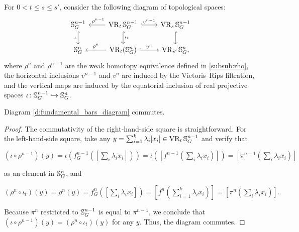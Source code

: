 \subsubsection{}

For $0<t\leq s \leq s'$, consider the following diagram of topological spaces:
\begin{equation}\label{d:fundamental_bars_diagram}
	\begin{tikzcd}
		\bS^{n-1}_G
		\ar[d, hook,"{\iota}" left]
		&
		\VR_t\bS^{n-1}_G
		\ar[d, hook,"\iota_t"]
		\ar[l, "\ \rho^{n-1}" above]
		\ar[r, hook, "v^{n-1}"]
		&
		\VR_{s}\bS^{n-1}_G
		\ar[d, hook]
		\\
		\bS^{n}_G
		&
		\VR_t(\bS^{n}_G)
		\ar[l, "\rho^n" above]
		\ar[r, hook, "v^{n}"]
		&
		\VR_{s'}\bS^{n}_G,
	\end{tikzcd}
\end{equation}
where $\rho^n$ and $\rho^{n-1}$ are the weak homotopy equivalence defined in \cref{subsub:rho}, the horizontal inclusions $v^{n-1}$ and $v^n$ are induced by the Vietoris--Rips filtration, and the vertical maps are induced by the equatorial inclusion of real projective spaces $\iota \colon \mathbb{S}^{n-1}_G \hookrightarrow \mathbb{S}^{n}_G$.

\medskip\lemma
Diagram \eqref{d:fundamental_bars_diagram} commutes.

\begin{proof}
	The commutativity of the right-hand-side square is straightforward.
	For the left-hand-side square, take any $y = \sum_{i=1}^k \lambda_i [x_i] \in \operatorname{VR}_t\mathbb{S}^{n-1}_G$ and verify that
	\begin{center}
		$(\iota \circ \rho^{n-1})(y)
		=\iota(f^{n-1}_G([\sum_i \lambda_i x_i]))
		=\iota([f^{n-1}(\sum_i \lambda_i x_i)])
		=[\pi^{n-1}(\sum_i \lambda_i x_i)]
		$
	\end{center}
	as an element in $\mathbb{S}^n_G$, and
	\begin{center}
		$(\rho^{n} \circ \iota_t)(y) = \rho^{n}(y) = f^{n}_G([\sum_i \lambda_i x_i]) = [f^{n}(\sum_{i=1}^k \lambda_i x_i)] = [\pi^{n}(\sum_i \lambda_i x_i)].
		$
	\end{center}
	Because $\pi^{n}$ restricted to $\mathbb{S}^{n-1}_G$ is equal to $\pi^{n-1}$, we conclude that $(\iota \circ \rho^{n-1})(y) = (\rho^n \circ \iota_t)(y)$ for any $y$.
	Thus, the diagram commutes.
\end{proof}

\subsubsection{}\label{subsub:foundamental_bar_rpn_lemma}

